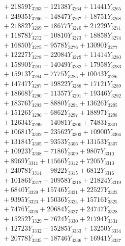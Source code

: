 \documentclass[a4paper,10pt]{article}
\begin{document}
{\begin{align}
&\;  + 21859 Y_{3263} + 12138 Y_{3264} + 11441 Y_{3265} \\[0.3ex]
&\;  + 24935 Y_{3266} + 14847 Y_{3267} + 18751 Y_{3268} \\[0.5ex]\allowbreak
&\;  + 21882 Y_{3269} + 18677 Y_{3270} + 21229 Y_{3271} \\[0.3ex]
&\;  + 11878 Y_{3272} + 10810 Y_{3273} + 18858 Y_{3274} \\[0.3ex]
&\;  + 16850 Y_{3275} + 9578 Y_{3276} + 13090 Y_{3277} \\[0.3ex]
&\;  + 12227 Y_{3278} + 22084 Y_{3279} + 11414 Y_{3280} \\[0.3ex]
&\;  + 15890 Y_{3281} + 14049 Y_{3282} + 17958 Y_{3283} \\[0.3ex]
&\;  + 15913 Y_{3284} + 7775 Y_{3285} + 10043 Y_{3286} \\[0.3ex]
&\;  + 14747 Y_{3287} + 19822 Y_{3288} + 17121 Y_{3289} \\[0.3ex]
&\;  + 18668 Y_{3290} + 11357 Y_{3291} + 19346 Y_{3292} \\[0.3ex]
&\;  + 18376 Y_{3293} + 8880 Y_{3294} + 13626 Y_{3295} \\[0.3ex]
&\;  + 15126 Y_{3296} + 6862 Y_{3297} + 18897 Y_{3298} \\[0.5ex]\allowbreak
&\;  + 12634 Y_{3299} + 14081 Y_{3300} + 7483 Y_{3301} \\[0.3ex]
&\;  + 10681 Y_{3302} + 23562 Y_{3303} + 10900 Y_{3304} \\[0.3ex]
&\;  + 13184 Y_{3305} + 9353 Y_{3306} + 13153 Y_{3307} \\[0.3ex]
&\;  + 10923 Y_{3308} + 7186 Y_{3309} + 9807 Y_{3310} \\[0.3ex]
&\;  + 8969 Y_{3311} + 11566 Y_{3312} + 7205 Y_{3313} \\[0.3ex]
&\;  + 24078 Y_{3314} + 9822 Y_{3315} + 6812 Y_{3316} \\[0.3ex]
&\;  + 10186 Y_{3317} + 10958 Y_{3318} + 21824 Y_{3319} \\[0.3ex]
&\;  + 6840 Y_{3320} + 15746 Y_{3321} + 22527 Y_{3322} \\[0.3ex]
&\;  + 9395 Y_{3323} + 15036 Y_{3324} + 15716 Y_{3325} \\[0.3ex]
&\;  + 7476 Y_{3326} + 20684 Y_{3327} + 24747 Y_{3328} \\[0.5ex]\allowbreak
&\;  + 15252 Y_{3329} + 7624 Y_{3330} + 21794 Y_{3331} \\[0.3ex]
&\;  + 12723 Y_{3332} + 15285 Y_{3333} + 13250 Y_{3334} \\[0.3ex]
&\;  + 20778 Y_{3335} + 18746 Y_{3336} + 16941 Y_{3337} \\[0.3ex]

\end{align}}
\end{document}
